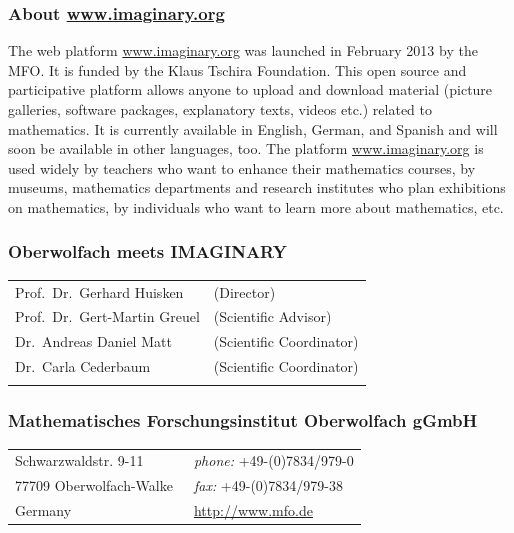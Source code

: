\documentclass[a4paper,12pt]{article}
\begin{document}
\subsubsection*{About \url{www.imaginary.org}}
The web platform \url{www.imaginary.org} was launched in February 2013 by the MFO. It is funded by the Klaus Tschira Foundation. This open source and participative platform allows anyone to upload and download material (picture galleries, software packages, explanatory texts, videos etc.) related to mathematics. It is currently available in English, German, and Spanish and will soon be available in other languages, too. The platform \url{www.imaginary.org} is used widely by teachers who want to enhance their mathematics courses, by museums, mathematics departments and research institutes who plan exhibitions on mathematics, by individuals who want to learn more about mathematics, etc.\\[1ex]

\subsubsection*{Oberwolfach meets IMAGINARY}
\begin{tabular}{@{}ll@{}}
Prof.~Dr.~Gerhard Huisken & (Director)\\
Prof.~Dr.~Gert-Martin Greuel\quad\quad\quad\quad & (Scientific Advisor)\\
Dr.~Andreas Daniel Matt & (Scientific Coordinator)\\
Dr.~Carla Cederbaum & (Scientific Coordinator)\\
\quad&\\[-1ex]
\end{tabular}
\vspace{2ex}

\subsubsection*{Mathematisches Forschungsinstitut Oberwolfach gGmbH}
\begin{tabular}{@{}ll@{}}
Schwarzwaldstr. 9-11&\,\,\,{\it phone:} +49-(0)7834/979-0\\
77709 Oberwolfach-Walke\quad\quad\quad\quad&\,\,\,{\it fax:} +49-(0)7834/979-38\\
Germany&\,\,\,\url{http://www.mfo.de}
\end{tabular}
\end{document}

